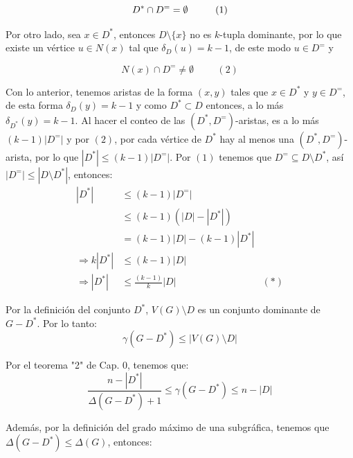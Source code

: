 \documentclass{article}
\begin{document}
$$D^*\cap D^= =\emptyset \hspace {1 cm} (1)$$

Por otro lado, sea $x \in D^*$, entonces $D\setminus \{x\}$ no es $k$-tupla dominante, por lo que existe un vértice $u \in N(x)$ tal que $\delta_D(u)=k-1$, de este modo $u \in D^=$ y 

$$N(x)\cap D^= \neq \emptyset \hspace {1cm} (2)$$



Con lo anterior, tenemos aristas de la forma $(x,y)$ tales que $x\in D^*$ y $y\in D^=$, de esta forma $\delta_D(y)=k-1$ y como $D^*\subset D$ entonces, a lo más $\delta_{D^*}(y)=k-1$. Al hacer el conteo de las $(D^*, D^=)$-aristas, es a lo más $(k-1)|D^=|$ y por $(2)$, por cada vértice de $D^*$ hay al menos una $(D^*,D^=)$-arista, por lo que $|D^*|\le (k-1)|D^=|$. Por $(1)$ tenemos que $D^= \subseteq D\setminus D^*$, así $|D^=| \le |D\setminus D^*|$, entonces:\\


\begin{align*}
|D^*|&\leq (k-1)|D^=|\\
&\leq (k-1)(|D|-|D^*|)\\
& = (k-1)|D|-(k-1)|D^*|\\
\Longrightarrow k|D^*|&\leq (k-1)|D|\\
\Longrightarrow |D^*|&\leq \frac{(k-1)}{k}|D| & (*)
\end{align*}



Por la definición del conjunto $D^*$, $V(G)\setminus D$ es un conjunto dominante de $G-D^*$. Por lo tanto: \\


$$\gamma(G-D^*)\le |V(G)\setminus D|$$


Por el teorema "2" de Cap. 0, tenemos que:\\

 $$\frac{n-|D^*|}{\Delta(G-D^*)+1}\leq \gamma(G-D^*) \le n - |D|$$

Además, por la definición del grado máximo de una subgráfica, tenemos que $\Delta(G-D^*) \le \Delta(G)$, entonces:\\
\end{document}
